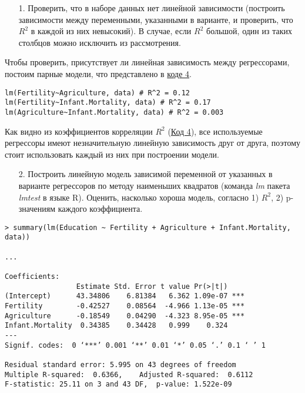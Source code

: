 \begin{enumerate}
    \item[1.] Проверить, что в наборе данных нет линейной зависимости (построить зависимости между переменными, указанными в варианте, и проверить, что $R^2$ в каждой из них невысокий). В случае, если $R^2$ большой, один из таких столбцов можно исключить из рассмотрения.
\end{enumerate}

Чтобы проверить, присутствует ли линейная зависимость между регрессорами, постоим парные модели, что представлено в \hyperref[code:4]{коде 4}.

\begin{code}
\begin{verbatim}
lm(Fertility~Agriculture, data) # R^2 = 0.12
lm(Fertility~Infant.Mortality, data) # R^2 = 0.17
lm(Agriculture~Infant.Mortality, data) # R^2 = 0.003
\end{verbatim}
\label{code:4}
\end{code}

Как видно из коэффициентов корреляции $R^2$ (\hyperref[code:4]{Код 4}), все используемые регрессоры имеют незначительную линейную зависимость друг от друга, поэтому стоит использовать каждый из них при построении модели.

\begin{enumerate}
    \item[2.] Построить линейную модель зависимой переменной от указанных в варианте регрессоров по методу наименьших квадратов (команда \textit{lm} пакета \textit{lmtest} в языке R). Оценить, насколько хороша модель, согласно 1) $R^2$, 2) p-значениям каждого коэффициента.
\end{enumerate}

\begin{code}
\begin{verbatim}
> summary(lm(Education ~ Fertility + Agriculture + Infant.Mortality, data))

...

Coefficients:
                 Estimate Std. Error t value Pr(>|t|)    
(Intercept)      43.34806    6.81384   6.362 1.09e-07 ***
Fertility        -0.42527    0.08564  -4.966 1.13e-05 ***
Agriculture      -0.18549    0.04290  -4.323 8.95e-05 ***
Infant.Mortality  0.34385    0.34428   0.999    0.324    
---
Signif. codes:  0 ‘***’ 0.001 ‘**’ 0.01 ‘*’ 0.05 ‘.’ 0.1 ‘ ’ 1

Residual standard error: 5.995 on 43 degrees of freedom
Multiple R-squared:  0.6366,    Adjusted R-squared:  0.6112 
F-statistic: 25.11 on 3 and 43 DF,  p-value: 1.522e-09
\end{verbatim}
\label{code:5}
\end{code}

